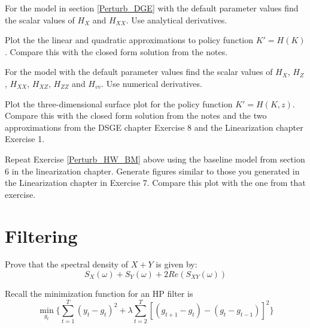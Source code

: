 \documentclass[letterpaper,11pt]{article}
\theoremstyle{definition}
\begin{document}
\begin{spacing}{1.5}
	\begin{Exercise} \label{Perturb_HW_BM_NoStoch}
		For the \citet{BrockMirman1972} model in section \ref{Perturb_DGE} with the default parameter values find the scalar values of $H_X$ and $H_{XX}$.  Use analytical derivatives.

		Plot the the linear and quadratic approximations to policy function $K' = H(K)$.  Compare this with the closed form solution from the notes.
	\end{Exercise}

	\begin{Exercise} \label{Perturb_HW_BM}
		For the \citet{BrockMirman1972} model with the default parameter values find the scalar values of $H_X$, $H_Z$, $H_{XX}$, $H_{XZ}$, $H_{ZZ}$ and $H_{vv}$.  Use numerical derivatives.

		Plot the three-dimensional surface plot for the policy function $K' = H(K,z)$.  Compare this with the closed form solution from the notes and the two approximations from the DSGE chapter Exercise 8 and the Linearization chapter Exercise 1.
	\end{Exercise}

	\begin{Exercise} \label{Perturb_HW_BAse}
		Repeat Exercise \ref{Perturb_HW_BM} above using the baseline model from section 6 in the linearization chapter.  Generate figures similar to those you generated in the Linearization chapter in Exercise 7.  Compare this plot with the one from that exercise.
	\end{Exercise}


\section*{Filtering}\label{Filter_HW}
\setcounter{Exercise}{0}
    \begin{Exercise} \label{Filter_HW_CoVar_Proof}
        Prove that the spectral density of $X+Y$ is given by:
        $$S_X(\omega) + S_Y(\omega) + 2 Re(S_{XY}(\omega))$$
    \end{Exercise}

    \begin{Exercise} \label{Filter_HW_HP_Proofs}
        Recall the minimization function for an HP filter is
        \begin{equation}\label{Filter_HW_HP_Proofs_eq01}
        \min_{g_t} \{ \sum_{t=1}^T (y_t - g_t)^2  +\lambda\sum_{t=2}^T[(g_{t+1}-g_{t}) - (g_{t}-g_{t-1})]^2\}
        \end{equation}


\end{Exercise}
\end{spacing}
\end{document}
